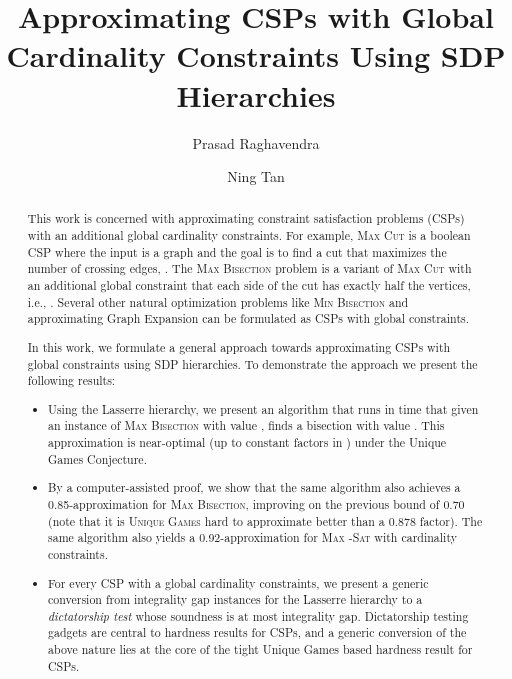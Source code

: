 \documentclass[11pt]{article}
\title{Approximating CSPs with Global Cardinality Constraints Using SDP Hierarchies}
\author{Prasad Raghavendra \and Ning Tan}
\date{}
\theoremstyle{definition}
\newcommand{\problemmacro}[1]{\texorpdfstring{\textsc{#1}}{#1}\xspace}
\newcommand{\uniquegames}{\problemmacro{Unique Games}}
\newcommand{\maxcut}{\problemmacro{Max Cut}}
\newcommand{\maxtwosat}{\problemmacro{Max -Sat}}
\newcommand{\minbisection}{\problemmacro{Min Bisection}}
\newcommand{\maxbisection}{\problemmacro{Max Bisection}}
\newcommand{\draftbox}{\begin{center}
  \fbox{\begin{minipage}{2in}\begin{center}\Large\textsc{Working Draft}\\Please do not distribute\end{center}\end{minipage}}\end{center}
\vspace{0.2cm}}
\newcommand{\draftbox}{}
\numberwithin{equation}{section}
\begin{document}
\maketitle
\draftbox
\thispagestyle{empty}



\begin{abstract}



	This work is concerned with approximating constraint
satisfaction problems (CSPs) with an
	additional global cardinality constraints.  For example, \maxcut is a boolean CSP where the input is a
	graph  and the goal is to find a cut  that maximizes the number
	of crossing edges, .  The \maxbisection problem is a variant of \maxcut
	with an additional global constraint that each side of the cut
	has exactly half the vertices, i.e., .
	Several other natural optimization problems like \minbisection and approximating Graph Expansion can be
	formulated as CSPs with global constraints.

	In this work, we formulate a general approach towards
	approximating CSPs with global constraints using SDP
	hierarchies.  To demonstrate the approach we present the
	following results:

	\begin{itemize}
	\item Using the Lasserre hierarchy, we present an algorithm
		that runs in time  that given
		an instance of \maxbisection with value ,
		finds a bisection with value .
		This approximation is near-optimal (up to constant
		factors in ) under the Unique Games Conjecture.
    \item By a computer-assisted proof, we show that the same
algorithm also achieves a 0.85-approximation for \maxbisection,
improving on the previous bound of 0.70 (note that it is \uniquegames
hard to approximate better than a 0.878 factor). The same algorithm also yields a 0.92-approximation for \maxtwosat with cardinality constraints.
	\item   For every CSP with a global cardinality constraints, we present a generic conversion from integrality gap
		instances for the Lasserre hierarchy to a {\it dictatorship
		test} whose soundness is at most integrality gap.
		Dictatorship testing gadgets are central to hardness
		results for CSPs, and a generic conversion of the
		above nature lies at the core of the tight Unique Games
		based hardness result for CSPs. \cite{Raghavendra08}

\end{itemize}
\end{abstract}
\clearpage
\end{document}

